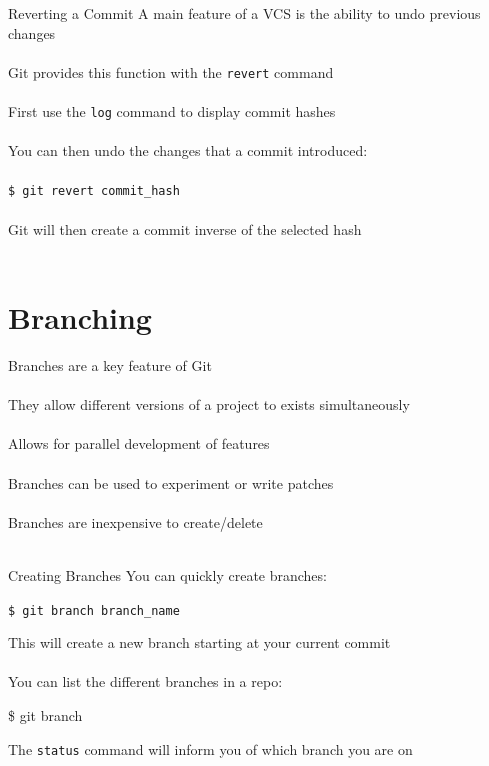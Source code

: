 \documentclass{beamer}
\begin{document}
\begin{frame}{Reverting a Commit}
    A main feature of a VCS is the ability to undo previous changes \\~\\

    Git provides this function with the {\tt revert} command \\~\\

    First use the {\tt log} command to display commit hashes \\~\\

    You can then undo the changes that a commit introduced: \\~\\
    
    {\tt \$ git revert commit\_hash} \\~\\

    Git will then create a commit inverse of the selected hash \\~\\
\end{frame}

\section{Branching}
\begin{frame}{\secname}
    Branches are a key feature of Git \\~\\

    They allow different versions of a project to exists simultaneously \\~\\
    
    Allows for parallel development of features \\~\\

    Branches can be used to experiment or write patches \\~\\

    Branches are inexpensive to create/delete \\~\\
\end{frame}

\begin{frame}{Creating Branches}
    You can quickly create branches:

    {\tt \$ git branch branch\_name}

    This will create a new branch starting at your current commit\\~\\

    You can list the different branches in a repo:

    {\$ git branch}

    The {\tt status} command will inform you of which branch you are on
\end{frame}
\end{document}
